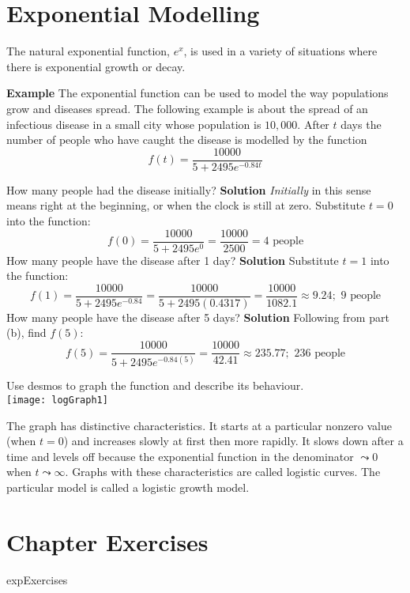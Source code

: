 \section{Exponential Modelling}
The natural exponential function, $e^x$, is used in a variety of situations where there is exponential growth or decay. 

\textbf{Example} The exponential function can be used to model the way populations grow and diseases spread. The following
example is about the spread of an infectious disease in a small city whose population is $10,000$. After $t$ days the number of people who have caught the disease is modelled by the function
\begin{equation*}f (t) =\frac{10000}{5 +2495 e^{ -0.84 t}}
\end{equation*}


\begin{tasks}
	\task How many people had the disease initially? 
	\textbf{Solution} \textit{Initially} in this sense means right at the beginning, or when the clock is still at zero. Substitute $t=0$ into the function:
	\[f(0)=\frac{10000}{5+2495e^0}=\frac{10000}{2500}=4\text{ people}\]
	\task How many people have the disease after 1 day?
	\textbf{Solution} Substitute $t=1$ into the function:
	\[f(1)=\frac{10000}{5+2495e^{-0.84}}=\frac{10000}{5+2495(0.4317)}=\frac{10000}{1082.1}\approx 9.24;\text{ 9 people}\]
	\task How many people have the disease after 5 days? 
	\textbf{Solution} Following from part (b), find $f(5)$:\\
	\[f(5)=\frac{10000}{5+2495e^{-0.84(5)}}=\frac{10000}{42.41}\approx 235.77;\text{ 236 people}\]
	
	\task Use desmos to graph the function and describe its behaviour. \\
	\texttt{[image: logGraph1]}
\end{tasks}

The graph has distinctive characteristics. It starts at a particular nonzero value (when $t =0$) and increases slowly at first then more rapidly. It slows down after a time and levels off because the exponential function in the denominator $ \leadsto 0$ when $t \leadsto \infty $. Graphs with these characteristics are called logistic curves. The particular model is called a logistic growth model. 

\section{Chapter Exercises}
{expExercises}

